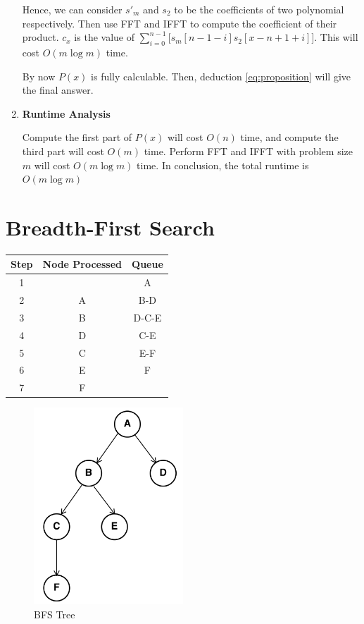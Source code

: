 \documentclass[11pt]{article}
\newenvironment{qparts}{\begin{enumerate}[{(}a{)}]}{\end{enumerate}}
\begin{document}
\begin{qparts}
\begin{enumerate}
		Hence, we can consider $s\prime_m$ and $s_2$ to be the coefficients of two polynomial respectively. Then use FFT  and IFFT to compute the coefficient of their product. $c_x$ is the value of $\sum_{i=0}^{n-1}\bigg [s_m[n-1-i]s_2[x-n+1+i]\bigg]$. This will cost $O(m\log m)$ time.
		
		By now $P(x)$ is fully calculable. Then, deduction \eqref{eq:proposition} will give the final answer.
		

		\item \textbf{Runtime Analysis}
		
		Compute the first part of $P(x)$ will cost $O(n)$ time, and compute the third part will cost $O(m)$ time. Perform FFT and IFFT with problem size $m$ will cost $O(m\log m)$ time. In conclusion, the total runtime is $O(m\log m)$
		
		
		
	\end{enumerate}
\end{qparts}

\newpage
\section{Breadth-First Search}

	\begin{center}
	\begin{tabular}{c | c | c}
	\hline
	Step	& Node Processed        &   Queue         \\\hline
	1	&	&   A		\\\hline
	2	&A	&   B-D	\\\hline
	3	&B	&   D-C-E	\\\hline
	4	&D	&   C-E	\\\hline
	5	&C	&   E-F	\\\hline
	6	&E	&   F		\\\hline
	7	&F	&     		\\\hline
	\end{tabular}
	\end{center}


\begin{figure}[h]
\centering
\includegraphics[width=0.5\textwidth]{hw3_bfs.png}
\caption{\label{fig:bfs}BFS Tree}
\end{figure}
\end{document}

